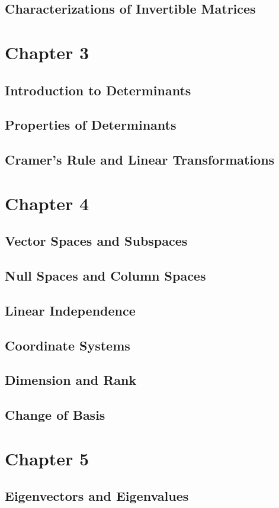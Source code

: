 \documentclass{article}
\begin{document}
\subsection{Characterizations of Invertible Matrices}
\section{Chapter 3}
\subsection{Introduction to Determinants}
\subsection{Properties of Determinants}
\subsection{Cramer's Rule and Linear Transformations}
\section{Chapter 4}
\subsection{Vector Spaces and Subspaces}
\subsection{Null Spaces and Column Spaces}
\subsection{Linear Independence}
\subsection{Coordinate Systems}
\subsection{Dimension and Rank}
\subsection{Change of Basis}
\section{Chapter 5}
\subsection{Eigenvectors and Eigenvalues}
\end{document}
